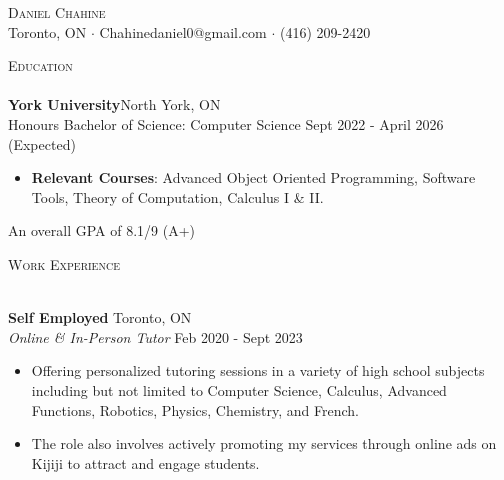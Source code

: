 \documentclass[a4paper]{article}
\newcommand{\lineunder} {
	\vspace*{-8pt} \\
	\hspace*{-18pt} \hrulefill \\
}
\newcommand{\header} [1] {
	{\hspace*{-18pt}\vspace*{6pt} \textsc{#1}}
	\vspace*{-6pt} \lineunder
}
\begin{document}
	\vspace*{-40pt}
	
	
	
	\vspace*{-10pt}
	\begin{center}
		{\Huge \scshape {Daniel Chahine}}\\
		Toronto, ON $\cdot$ Chahinedaniel0@gmail.com $\cdot$ (416) 209-2420\\
	\end{center}
	
	\header{Education}
	\textbf{York University}\hfill North York, ON\\
	Honours Bachelor of Science: Computer Science \hfill Sept 2022 - April 2026 (Expected)\\

	\begin{itemize} \itemsep 0pt
		\item \textbf{Relevant Courses}: Advanced Object Oriented Programming, Software Tools, Theory of Computation, Calculus I \& II.
	\end{itemize}
	\hspace{21pt}
	 An overall GPA of 8.1/9 (A+)
	\vspace{2mm}
	
	\header{Work Experience}
	\vspace{1mm}
	
	\textbf{Self Employed} \hfill Toronto, ON\\
	\textit{Online \& In-Person Tutor} \hfill Feb 2020 - Sept 2023\\
	\vspace{-1mm}
	\begin{itemize} \itemsep 1pt
		\item Offering personalized tutoring sessions in a variety of high school subjects including but not limited to Computer Science, Calculus, Advanced Functions, Robotics, Physics, Chemistry, and French.
		\item The role also involves actively promoting my services through online ads on Kijiji to attract and engage students.
	\end{itemize}
	
\end{document}
